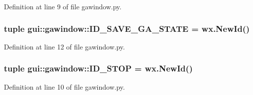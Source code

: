 Definition at line 9 of file gawindow.py.
\subsubsection{\setlength{\rightskip}{0pt plus 5cm}tuple {\bf gui::gawindow::ID\_\-SAVE\_\-GA\_\-STATE} = wx.NewId()\hspace{0.3cm}{\tt  [static]}}\label{namespacegui_1_1gawindow_51723a3e73453a76ea94427f5b01995b}




Definition at line 12 of file gawindow.py.
\subsubsection{\setlength{\rightskip}{0pt plus 5cm}tuple {\bf gui::gawindow::ID\_\-STOP} = wx.NewId()\hspace{0.3cm}{\tt  [static]}}\label{namespacegui_1_1gawindow_6c3439c9995975cb1528bae41107b96a}




Definition at line 10 of file gawindow.py.
